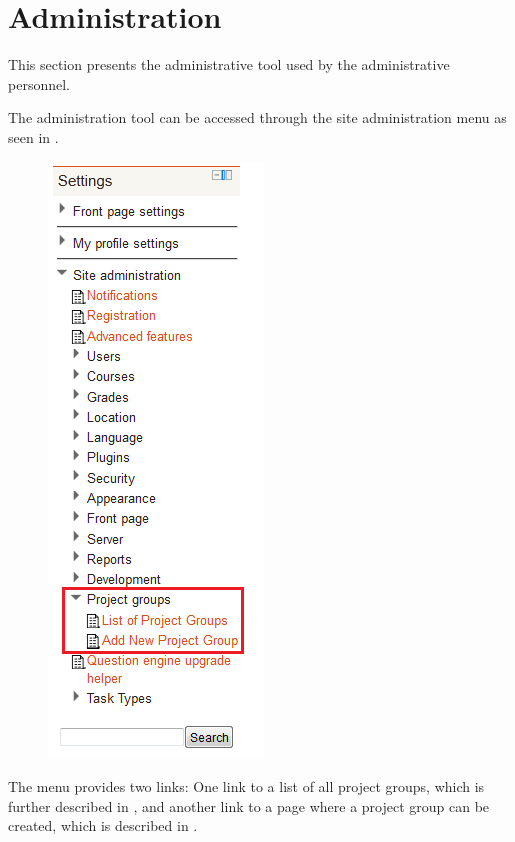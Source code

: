\FloatBarrier
\section{Administration}
\label{sec:adminPrensentation}
This section presents the administrative tool used by the administrative personnel.

The administration tool can be accessed through the site administration menu as seen in .

\begin{figure}[htb]
	\centering
		\includegraphics[scale=0.6]{images/admin-navigation.png}
	\label{fig:navigation}
\end{figure}
The menu provides two links: One link to a list of all project groups, which is further described in , and another link to a page where a project group can be created, which is described in .

\FloatBarrier

